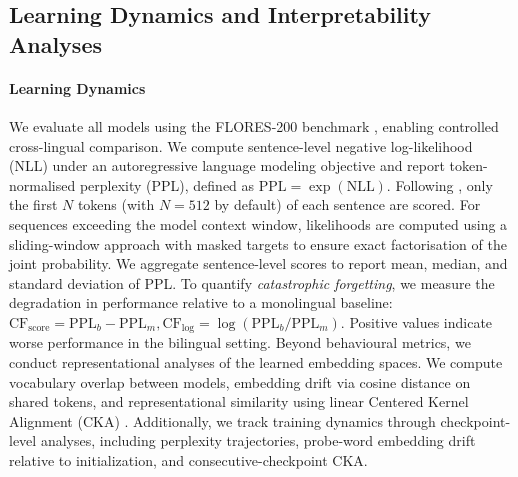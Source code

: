 
\subsection{Learning Dynamics and Interpretability Analyses}

\paragraph{Learning Dynamics} We evaluate all models using the FLORES-200 benchmark \cite{costa2022no}, enabling controlled cross-lingual comparison. We compute sentence-level negative log-likelihood (NLL) under an autoregressive language modeling objective and report token-normalised perplexity (PPL), defined as $\mathrm{PPL} = \exp(\mathrm{NLL})$. Following \citet{chang2024goldfish}, only the first $N$ tokens (with $N=512$ by default) of each sentence are scored. For sequences exceeding the model context window, likelihoods are computed using a sliding-window approach with masked targets to ensure exact factorisation of the joint probability. We aggregate sentence-level scores to report mean, median, and standard deviation of PPL.  To quantify \textit{catastrophic forgetting}, we measure the degradation in performance relative to a monolingual baseline: $\mathrm{CF}_{\text{score}} = \mathrm{PPL}_{b} - \mathrm{PPL}_{m}, \mathrm{CF}_{\log} = \log (\mathrm{PPL}_{b} / \mathrm{PPL}_{m})$. Positive values indicate worse performance in the bilingual setting. Beyond behavioural metrics, we conduct representational analyses of the learned embedding spaces. We compute vocabulary overlap between models, embedding drift via cosine distance on shared tokens, and representational similarity using linear Centered Kernel Alignment (CKA) \citep{kornblith2019similarity}. Additionally, we track training dynamics through checkpoint-level analyses, including perplexity trajectories, probe-word embedding drift relative to initialization, and consecutive-checkpoint CKA. 




